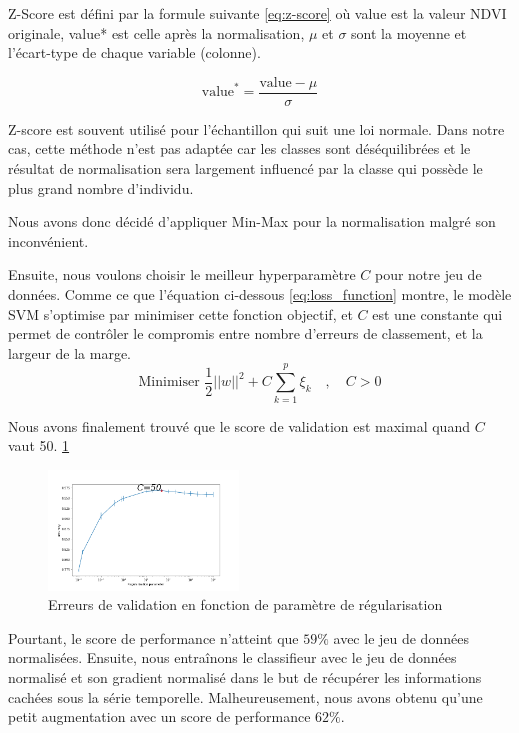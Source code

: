 \documentclass[twocolumn,10pt]{article}
\begin{document}
Z-Score est défini par la formule suivante \ref{eq:z-score} où value est la valeur NDVI originale, value* est celle après la normalisation, $ \mu $ et $ \sigma $ sont la moyenne et l'écart-type de chaque variable (colonne).

\begin{equation}
	\label{eq:z-score}
	\text{value}^* = \frac{\text{value} - \mu}{\sigma}
\end{equation}

Z-score est souvent utilisé pour l'échantillon qui suit une loi normale. Dans notre cas, cette méthode n'est pas adaptée car les classes sont déséquilibrées et le résultat de normalisation sera largement influencé par la classe qui possède le plus grand nombre d'individu.

Nous avons donc décidé d'appliquer Min-Max pour la normalisation malgré son inconvénient.

Ensuite, nous voulons choisir le meilleur hyperparamètre $\displaystyle C$ pour notre jeu de données. Comme ce que l'équation ci-dessous \ref{eq:loss_function} montre, le modèle SVM s'optimise par minimiser cette fonction objectif, et $\displaystyle C$ est une constante qui permet de contrôler le compromis entre nombre d'erreurs de classement, et la largeur de la marge. 
\begin{equation}
\label{eq:loss_function}
\displaystyle {\mbox{Minimiser }}{\frac {1}{2}}||w||^{2}+C\sum _{k=1}^{p}\xi _{k}\quad ,\quad C>0
\end{equation}

Nous avons finalement trouvé que le score de validation est maximal quand $\displaystyle C$ vaut 50. \ref{fig:regularization}

\begin{figure}[htbp]
	\begin{center}
		\includegraphics[width=0.45\textwidth]{figures/SVM/C.png}
		\caption{\label{fig:regularization}Erreurs de validation en fonction de paramètre de régularisation} 
	\end{center}
\end{figure}

Pourtant, le score de performance n'atteint que $ 59\% $ avec le jeu de données normalisées. Ensuite, nous entraînons le classifieur avec le jeu de données normalisé et son gradient normalisé dans le but de récupérer les informations cachées sous la série temporelle. Malheureusement, nous avons obtenu qu'une petit augmentation avec un score de performance $ 62\% $. 
\end{document}
